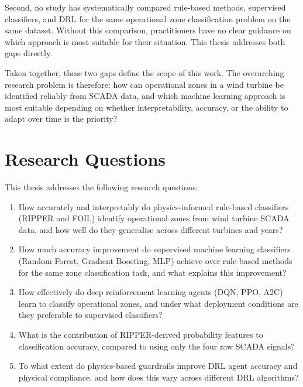 Second, no study has systematically compared rule-based methods, supervised classifiers,
and DRL for the same operational zone classification problem on the same dataset. Without
this comparison, practitioners have no clear guidance on which approach is most suitable
for their situation. This thesis addresses both gaps directly.

Taken together, these two gaps define the scope of this work. The overarching research problem is therefore: how can operational zones in a wind turbine
be identified reliably from SCADA data, and which machine learning approach is most suitable
depending on whether interpretability, accuracy, or the ability to adapt over time is the
priority?

\section{Research Questions}
\label{sec:intro:rq}

This thesis addresses the following research questions:

\begin{enumerate}
  \item How accurately and interpretably do physics-informed rule-based classifiers
        (RIPPER and FOIL) identify operational zones from wind turbine SCADA data,
        and how well do they generalise across different turbines and years?

  \item How much accuracy improvement do supervised machine learning classifiers
        (Random Forest, Gradient Boosting, MLP) achieve over rule-based methods for
        the same zone classification task, and what explains this improvement?

  \item How effectively do deep reinforcement learning agents (DQN, PPO, A2C) learn
        to classify operational zones, and under what deployment conditions are they
        preferable to supervised classifiers?

  \item What is the contribution of RIPPER-derived probability features to
        classification accuracy, compared to using only the four raw SCADA signals?

  \item To what extent do physics-based guardrails improve DRL agent accuracy and
        physical compliance, and how does this vary across different DRL algorithms?
\end{enumerate}

